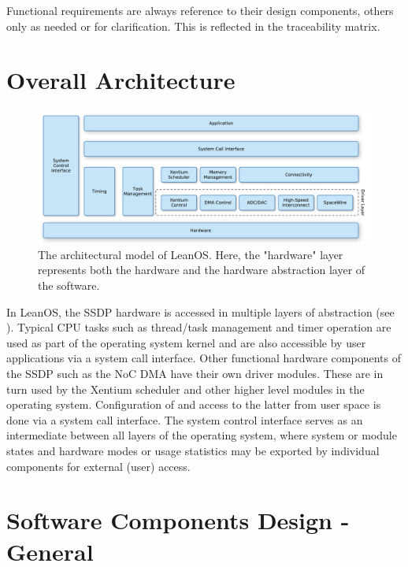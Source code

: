 \noindent
Functional requirements are always reference to their design components, others
only as needed or for clarification. This is reflected in the traceability
matrix.



\section{Overall Architecture}


\begin{figure}[htb]
\begin{center}
	\includegraphics[width=\columnwidth]{../requirements/images/OS_logical}
	\caption{The architectural model of LeanOS. Here, the "hardware" layer
	represents both the hardware and the hardware abstraction layer of
	the software.}
	\label{fig:logical_model}
\end{center}
\end{figure}


In LeanOS, the \gls{SSDP} hardware is accessed in multiple layers of
abstraction (see ). Typical \gls{CPU} tasks such as
thread/task management and timer operation are used as part of the operating
system kernel and are also accessible by user applications via a system call
interface. Other functional hardware components of the \gls{SSDP} such as the
\gls{NoC} \gls{DMA} have their own driver modules. These are in turn used by the
\gls{Xentium} scheduler and other higher level modules in the operating system.
Configuration of and access to the latter from user space is done via a system
call interface. The system control interface serves as an intermediate between
all layers of the operating system, where system or module states and hardware
modes or usage statistics may be exported by individual components for external
(user) access.




\section{Software Components Design - General}


